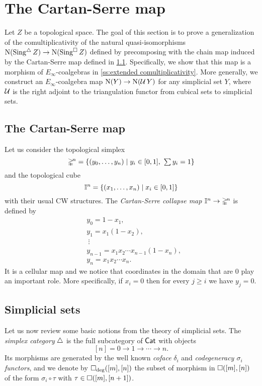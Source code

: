 
\section{The Cartan-Serre map} \label{s:the cartan-serre map}

Let $Z$ be a topological space.
The goal of this section is to prove a generalization of the comultiplicativity of the natural quasi-isomorphisms $\operatorname{N}(\operatorname{Sing^{\triangle}} Z) \to \operatorname{N}(\operatorname{Sing^{\square}} Z)$ defined by precomposing with the chain map induced by the Cartan-Serre map defined in \cref{ss:the cartan-serre map}.
Specifically, we show that this map is a morphism of $E_\infty$-coalgebras in \cref{ss:extended comultiplicativity}.
More generally, we construct an $E_\infty$-coalgebra map $\operatorname{N}(Y) \to \operatorname{N}(\operatorname{\mathcal{U}} Y)$ for any simplicial set $Y$, where $\operatorname{\mathcal{U}}$ is the right adjoint to the triangulation functor from cubical sets to simplicial sets.

\subsection{The Cartan-Serre map} \label{ss:the cartan-serre map}

Let us consider the topological simplex
\[
\mathbb{\Delta}^{\!n} = \{(y_0, \dots, y_n) \mid y_i \in [0,1], \ \textstyle{\sum} \, y_i = 1\}
\]
and the topological cube
\[
\mathbb{I}^{n} = \{(x_1, \dots, x_n) \mid x_i \in [0,1]\}
\]
with their usual CW structures.
The \textit{Cartan-Serre collapse map} $\mathbb{I}^n \to \mathbb{\Delta}^{\!n}$ is defined by
\begin{equation} \label{e:cartan-serre CW map}
\begin{split}
&y_0 = 1 - x_1, \\
&y_1 = x_1(1 - x_2), \\
&\ \vdots \\
&y_{n-1} = x_1 x_2 \cdots x_{n-1}(1-x_n), \\
&y_{n} = x_1 x_2 \cdots x_n.
\end{split}
\end{equation}
It is a cellular map and we notice that coordinates in the domain that are $0$ play an important role.
More specifically, if $x_i = 0$ then for every $j \geq i$ we have $y_{j} = 0$.

\subsection{Simplicial sets} \label{ss:simplicial sets}

Let us now review some basic notions from the theory of simplicial sets.
The \textit{simplex category} $\triangle$ is the full subcategory of $\mathsf{Cat}$ with objects
\[
[n] = 0 \to 1 \to \cdots \to n.
\]
Its morphisms are generated by the well known \textit{coface} $\delta_i$ and \textit{codegeneracy $\sigma_i$ functors}, and we denote by $\square_{\deg}([m], [n])$ the subset of morphism in $\square([m], [n])$ of the form $\sigma_i \circ \tau$ with $\tau \in \square([m], [n+1])$.


